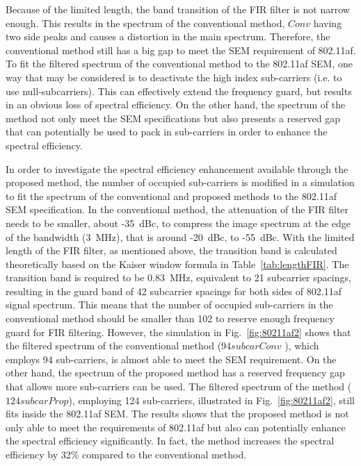 Because of the limited length, the band transition of the FIR filter is not narrow enough.
This results in the spectrum of the conventional method, $\mathit{Conv}$ having two side peaks and causes a distortion in the main spectrum.
Therefore, the conventional method still has a big gap to meet the SEM requirement of 802.11af.
To fit the filtered spectrum of the conventional method to the 802.11af SEM, one way that may be considered is to deactivate the high index sub-carriers (i.e. to use null-subcarriers).
This can effectively extend the frequency guard, but results in an obvious loss of spectral efficiency.
On the other hand, the spectrum of the method not only meet the SEM specifications but also presents a reserved gap that can potentially be used to pack in sub-carriers in order to enhance the spectral efficiency.

In order to investigate the spectral efficiency enhancement available through the proposed method, the number of occupied sub-carriers is modified in a simulation to fit the spectrum of the conventional and proposed methods to the 802.11af SEM specification. %
In the conventional method, the attenuation of the FIR filter needs to be smaller, about -35~dBc, to compress the image spectrum at the edge of the bandwidth (3~MHz), that is around -20~dBc, to -55~dBc.
With the limited length of the FIR filter, as mentioned above, the transition band is calculated theoretically  based on the Kaiser window formula in Table~\ref{tab:lengthFIR}.
The transition band is required to be 0.83~MHz, equivalent to 21 subcarrier spacings, resulting in the guard band of 42 subcarrier spacings for both sides of 802.11af signal spectrum.
This means that the number of occupied sub-carriers in the conventional method should be smaller than 102 to reserve enough frequency guard for FIR filtering.
However, the simulation in Fig.~\ref{fig:80211af2} shows that the filtered spectrum of the conventional method ($\mathit{94 subcar Conv}$ ), which employs 94  sub-carriers, is almost able to meet the SEM requirement.
On the other hand, the spectrum of the proposed method has a reserved frequency gap that allows more sub-carriers can be used. 
The filtered spectrum of the method ($\mathit{124 subcar Prop}$), employing 124 sub-carriers, illustrated in Fig.~\ref{fig:80211af2}, still fits inside the 802.11af SEM.
The results shows that the proposed method is not only able to meet the requirements of 802.11af but also can potentially enhance the spectral efficiency significantly.
In fact, the method increases the spectral efficiency by 32\% compared to the conventional method.

